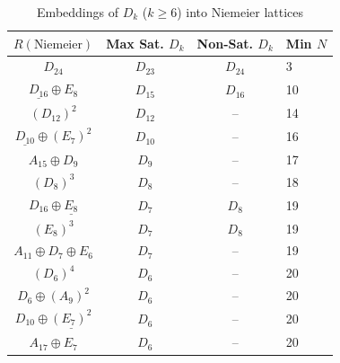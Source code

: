 \documentclass[11pt]{amsart}
\numberwithin{equation}{section}
\theoremstyle{plain}
\theoremstyle{remark}
\theoremstyle{definition}
\begin{document}
\begin{table}[htb!]
\renewcommand{\arraystretch}{1.60}
\begin{tabular}{|c|c|c|l|}
\hline
$R(\text{Niemeier})$& Max Sat. $D_k$& Non-Sat. $D_k$&Min $N$\\
\hline\hline
$D_{24}$ & $D_{23}$ & $D_{24}$& 3 \\
\hline
$\underline{D_{16}}\oplus E_8$ & $D_{15}$ & $D_{16}$ &10 \\
\hline
$(D_{12})^2$ & $D_{12}$ & -- &14 \\
$\underline{D_{10}}\oplus  (E_7)^2$ & $D_{10}$ & -- & 16 \\
$A_{15}\oplus  D_9$ & $D_{9}$ &  -- &17 \\
\hline
$(D_{8})^3$ & $D_{8}$ &  -- &18 \\
$D_{16}\oplus \underline{E_8}$ & $D_{7}$ &  $D_{8}$ & 19 \\
$(E_{8})^3$ & $D_{7}$ & $D_{8}$ & 19 \\
\hline
$A_{11}\oplus  D_7\oplus  E_6$ & $D_{7}$ & -- & 19 \\
$(D_{6})^4$ & $D_{6}$ &  -- &20 \\
$D_6\oplus (A_9)^2$ & $D_{6}$ &  -- & 20 \\
$D_{10}\oplus  \underline{(E_7)^2}$ & $D_{6}$ & -- & 20 \\
$A_{17}\oplus  E_7$ & $D_{6}$ &  -- & 20\\
\hline
\end{tabular}
\vspace{0.2cm}
\caption{Embeddings of $D_k$ ($k\ge 6$) into Niemeier lattices}\label{tabledkembed}
\end{table}
\end{document}
